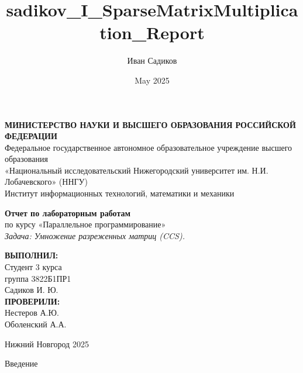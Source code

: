 \documentclass[12pt]{article}
\title{sadikov_I_SparseMatrixMultiplication_Report}
\author{Иван Садиков}
\date{May 2025}
\begin{document}
\begin{titlepage}
\begin{center}

\begin{center}
    \textbf{МИНИСТЕРСТВО НАУКИ И ВЫСШЕГО ОБРАЗОВАНИЯ РОССИЙСКОЙ ФЕДЕРАЦИИ} \\
    Федеральное государственное автономное образовательное учреждение высшего образования \\
    «Национальный исследовательский Нижегородский университет им. Н.И. Лобачевского» (ННГУ) \\
    Институт информационных технологий, математики и механики
\end{center}

\vspace{3cm}

\begin{center}
    \textbf{Отчет по лабораторным работам} \vspace{0.5cm}\\
    по курсу «Параллельное программирование» \vspace{0.5cm}\\
    \textit{Задача: Умножение разреженных матриц (CCS).}
\end{center}

\vspace{3cm}

\begin{flushright}
    \textbf{ВЫПОЛНИЛ:} \\ 
    Студент 3 курса \\
    группа 3822Б1ПР1 \\ 
    Садиков И. Ю. \\
    \vspace{0.5cm}
    \textbf{ПРОВЕРИЛИ:} \\ 
    Нестеров А.Ю. \\ 
    Оболенский А.А.
\end{flushright}

\vspace{1cm}

\begin{center}
    Нижний Новгород 2025\newpage
\end{center}

\end{center}
\end{titlepage}
\newpage
\begin{center}
\Large{Введение}
\end{center}
\end{document}
